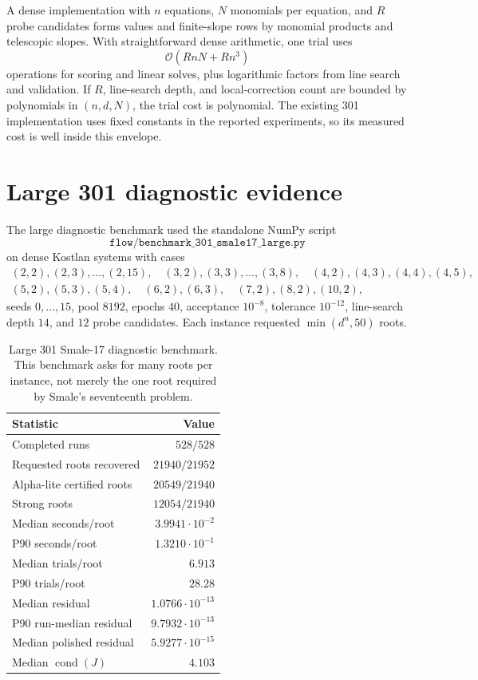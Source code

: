 \documentclass[11pt]{article}
\newcommand{\OO}{\mathcal O}
\DeclareMathOperator{\cond}{cond}
\begin{document}
A dense implementation with $n$ equations, $N$ monomials per equation, and $R$ probe candidates forms values and finite-slope rows by monomial products and telescopic slopes.  With straightforward dense arithmetic, one trial uses
\[
        \OO(R n N + R n^3)
\]
operations for scoring and linear solves, plus logarithmic factors from line search and validation.  If $R$, line-search depth, and local-correction count are bounded by polynomials in $(n,d,N)$, the trial cost is polynomial.  The existing 301 implementation uses fixed constants in the reported experiments, so its measured cost is well inside this envelope.

\section{Large 301 diagnostic evidence}

The large diagnostic benchmark used the standalone NumPy script
\[
\texttt{flow/benchmark\_301\_smale17\_large.py}
\]
on dense Kostlan systems with cases
\[
\begin{gathered}
(2,2),(2,3),\ldots,(2,15),\quad
(3,2),(3,3),\ldots,(3,8),\quad
(4,2),(4,3),(4,4),(4,5),\\
(5,2),(5,3),(5,4),\quad
(6,2),(6,3),\quad (7,2),(8,2),(10,2),
\end{gathered}
\]
seeds $0,\ldots,15$, pool $8192$, epochs $40$, acceptance $10^{-8}$, tolerance $10^{-12}$, line-search depth $14$, and $12$ probe candidates.  Each instance requested $\min(d^n,50)$ roots.

\begin{table}[h]
\centering
\begin{tabular}{lr}
\toprule
Statistic & Value\\
\midrule
Completed runs & $528/528$\\
Requested roots recovered & $21940/21952$\\
Alpha-lite certified roots & $20549/21940$\\
Strong roots & $12054/21940$\\
Median seconds/root & $3.9941\cdot10^{-2}$\\
P90 seconds/root & $1.3210\cdot10^{-1}$\\
Median trials/root & $6.913$\\
P90 trials/root & $28.28$\\
Median residual & $1.0766\cdot10^{-13}$\\
P90 run-median residual & $9.7932\cdot10^{-13}$\\
Median polished residual & $5.9277\cdot10^{-15}$\\
Median $\cond(J)$ & $4.103$\\
\bottomrule
\end{tabular}
\caption{Large 301 Smale-17 diagnostic benchmark.  This benchmark asks for many roots per instance, not merely the one root required by Smale's seventeenth problem.}
\label{tab:large}
\end{table}
\end{document}
